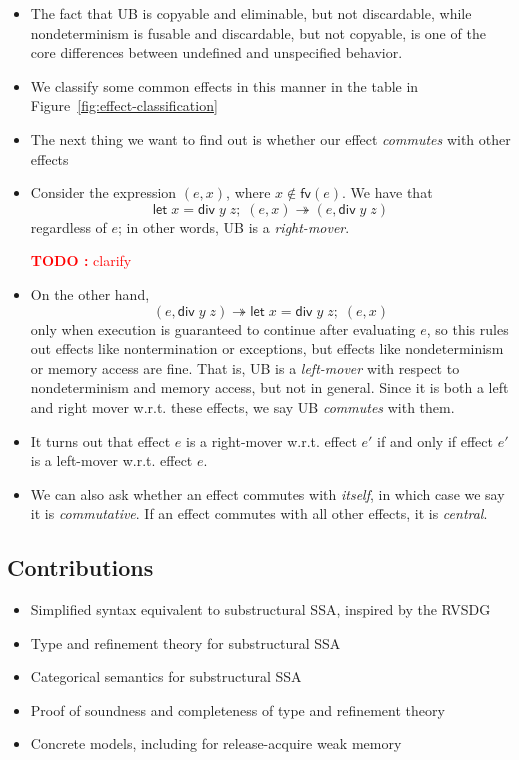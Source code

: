 \documentclass[acmsmall,screen,review]{acmart}
\newcounter{todos}
\newcommand{\TODO}[1]{{
  \stepcounter{todos}
  \begin{center}\large{\textcolor{red}{\textbf{TODO \arabic{todos}:} #1}}\end{center}
}}
\newcommand{\ms}[1]{\ensuremath{\mathsf{#1}}}
\newcommand{\letexpr}[3]{\ensuremath{\ms{let}\;#1 = #2;\;#3}}
\newcommand{\tref}{\twoheadrightarrow}
\begin{document}
\begin{itemize}
  \item The fact that UB is copyable and eliminable, but not discardable, while nondeterminism is
  fusable and discardable, but not copyable, is one of the core differences between undefined and
  unspecified behavior.
  \item We classify some common effects in this manner in the table in
  Figure~\ref{fig:effect-classification}
  \item The next thing we want to find out is whether our effect \emph{commutes} with other effects
  \item Consider the expression $(e, x)$, where $x \notin \ms{fv}(e)$. We have that
  $$\letexpr{x}{\ms{div}\;y\;z}{(e, x)} \tref (e, \ms{div}\;y\;z)$$
  regardless of $e$; in other words, UB is a \emph{right-mover}.
  \TODO{clarify}
  \item On the other hand, 
  $$(e, \ms{div}\;y\;z) \tref \letexpr{x}{\ms{div}\;y\;z}{(e, x)}$$ only when execution is
  guaranteed to continue after evaluating $e$, so this rules out effects like nontermination or
  exceptions, but effects like nondeterminism or memory access are fine. That is, UB is a
  \emph{left-mover} with respect to nondeterminism and memory access, but not in general. Since it
  is both a left and right mover w.r.t. these effects, we say UB \emph{commutes} with them.
  \item It turns out that effect $e$ is a right-mover w.r.t. effect $e'$ if and only if effect $e'$
  is a left-mover w.r.t. effect $e$.
  \item We can also ask whether an effect commutes with \emph{itself}, in which case we say it is
  \emph{commutative}. If an effect commutes with all other effects, it is \emph{central}.
\end{itemize}

\subsection{Contributions}

\begin{itemize}
  \item Simplified syntax equivalent to substructural SSA, inspired by the RVSDG
  \item Type and refinement theory for substructural SSA
  \item Categorical semantics for substructural SSA
  \item Proof of soundness and completeness of type and refinement theory
  \item Concrete models, including for release-acquire weak memory
\end{itemize}
\end{document}
